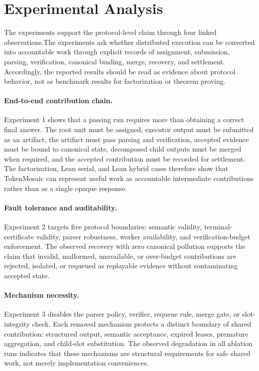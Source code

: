 \documentclass{article}
\theoremstyle{plain}
\begin{document}
\section{Experimental Analysis}

The experiments support the protocol-level claim through four linked observations.The
experiments ask whether distributed execution can be converted into accountable
work through explicit records of assignment, submission, parsing, verification,
canonical binding, merge, recovery, and settlement. Accordingly, the reported
results should be read as evidence about protocol behavior, not as benchmark
results for factorization or theorem proving.

\paragraph{End-to-end contribution chain.} Experiment 1 shows that a passing run requires more than obtaining a correct final answer. The root unit must be assigned, executor output must be submitted as an artifact, the artifact must pass parsing and verification, accepted evidence must be bound to canonical state, decomposed child outputs must be merged when required, and the accepted contribution must be recorded for settlement. The factorization, Lean serial, and Lean hybrid cases therefore show that TokenMosaic can represent useful work as accountable intermediate contributions rather than as a single opaque response.

\paragraph{Fault tolerance and auditability.} Experiment 2 targets five protocol boundaries: semantic validity, terminal-certificate validity, parser robustness, worker availability, and verification-budget enforcement. The observed recovery with zero canonical pollution supports the claim that invalid, malformed, unavailable, or over-budget contributions are rejected, isolated, or requeued as replayable evidence without contaminating accepted state.

\paragraph{Mechanism necessity.} Experiment 3 disables the parser policy, verifier, requeue rule, merge gate, or slot-integrity check. Each removed mechanism protects a distinct boundary of shared contribution: structured output, semantic acceptance, expired leases, premature aggregation, and child-slot substitution. The observed degradation in all ablation runs indicates that these mechanisms are structural requirements for safe shared work, not merely implementation conveniences.
\end{document}
